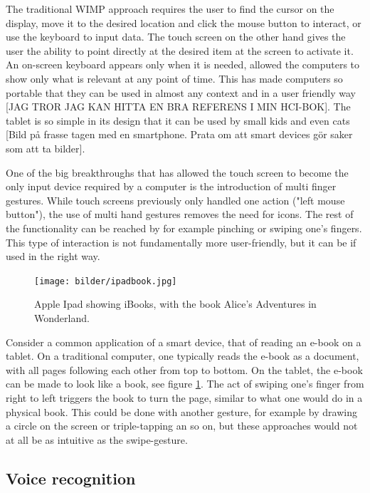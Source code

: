The traditional WIMP approach requires the user to find the cursor on the display, move it to the desired location and click the mouse button to interact, or use the keyboard to input data. The touch screen on the other hand gives the user the ability to point directly at the desired item at the screen to activate it. An on-screen keyboard appears only when it is needed, allowed the computers to show only what is relevant at any point of time. This has made computers so portable that they can be used in almost any context and in a user friendly way [JAG TROR JAG KAN HITTA EN BRA REFERENS I MIN HCI-BOK]. The tablet is so simple in its design that it can be used by small kids and even cats [Bild på frasse tagen med en smartphone. Prata om att smart devices gör saker som att ta bilder].

One of the big breakthroughs that has allowed the touch screen to become the only input device required by a computer is the introduction of multi finger gestures. While touch screens previously only handled one action ("left mouse button"), the use of multi hand gestures removes the need for icons. The rest of the functionality can be reached by for example pinching or swiping one's fingers. This type of interaction is not fundamentally more user-friendly, but it can be if used in the right way.

\begin{figure}[]
\texttt{[image: bilder/ipadbook.jpg]}
\caption{Apple Ipad showing iBooks, with the book Alice's Adventures in Wonderland.}
\label{ibooks}
\end{figure}
\nocite{ipadbook}

Consider a common application of a smart device, that of reading an e-book on a tablet. On a traditional computer, one typically reads the e-book as a document, with all pages following each other from top to bottom. On the tablet, the e-book can be made to look like a book, see figure \ref{ibooks}. The act of swiping one's finger from right to left triggers the book to turn the page, similar to what one would do in a physical book. This could be done with another gesture, for example by drawing a circle on the screen or triple-tapping an so on, but these approaches would not at all be as intuitive as the swipe-gesture.


\subsection{Voice recognition}

